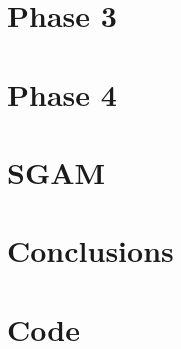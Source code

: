 \documentclass[10pt, a4paper]{report}
\begin{document}
\chapter{Phase 3}


\chapter{Phase 4}


\chapter{SGAM}


\chapter{Conclusions}


\chapter{Code}


\printbibliography[heading=bibintoc]
\end{document}
